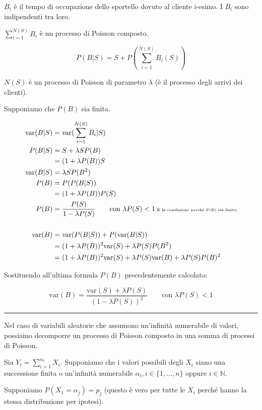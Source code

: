 \documentclass[a4paper,12pt]{book}
\begin{document}
$ B_i $ è il tempo di occupazione dello sportello dovuto al cliente i-esimo. I $ B_i $ sono indipendenti tra loro. 

$\sum_{i=1}^{N(S)}B_i$ è un processo di Poisson composto. 

$$ P(B|S) = S + P(\sum_{i=1}^{N(S)} B_i(S)) $$

$ N(S) $ è un processo di Poisson di parametro $\lambda$ (è il processo degli arrivi dei clienti). 

Supponiamo che $ P(B) $ sia finita.

\begin{align*}
	\text{var}(B|S) & = \text{var}(\sum_{i=1}^{N(S)} B_i | S) \\
	P(B|S) & = S + \lambda S P(B) \\
	& = (1 + \lambda P(B)) S \\
	\text{var}(B|S) & = \lambda S P(B^2) \\
	P(B) & = P(P(B|S)) \\
	& = (1 + \lambda P(B)) P(S) \\
	P(B) & = \frac{P(S)}{1 - \lambda P(S)} \qquad \text{con }\lambda P(S) < 1 \text{\tiny{ È la condizione perché P(B) sia finito}}\\
	\\
	\text{var}(B) & = \text{var}(P(B|S)) + P(\text{var}(B|S)) \\
	& = (1 + \lambda P(B))^2 \text{var}(S) + \lambda P(S) P(B^2) \\
	& = (1 + \lambda P(B))^2 \text{var}(S) + \lambda P(S) \text{var}(B) + \lambda P(S)	 P(B)^2
\end{align*}

Sostituendo all'ultima formula $ P(B) $ precedentemente calcolato:

$$ \text{var}(B) = \frac{\text{var}(S) + \lambda P(S)}{(1 - \lambda P(S))^2} \qquad \text{con } \lambda P(S) < 1 $$ 

\vspace{1cm}
\hrule
\vspace{1cm}
Nel caso di variabili aleatorie che assumono un'infinità numerabile di valori, possiamo decomporre un processo di Poisson composto in una somma di processi di Poisson.

Sia $ Y_t = \sum_{i=1}^{n_t} X_i $. Supponiamo che i valori possibili degli $ X_i $ siano una successione finita o un'infinità numerabile $\alpha_i, i \in \{1, ..., n\}$ oppure $ i \in \mathbb{N} $.

Supponiamo $ P(X_1 = \alpha_j) = p_j $ (questo è vero per tutte le $X_i$ perché hanno la stessa distribuzione per ipotesi). 
\end{document}
